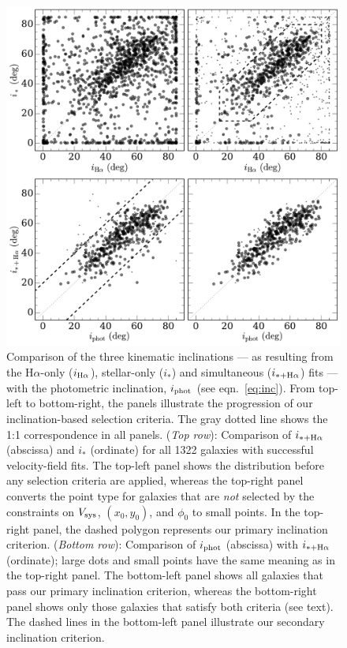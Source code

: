 \documentclass[apj,iop,revtex4,numberedappendix]{emulateapj}
\newcommand{\halpha}{H$\alpha$}
\begin{document}
\begin{figure}
%
\includegraphics[width=0.98\columnwidth]{figs/inc_select.pdf}
%
\caption{
%
Comparison of the three kinematic inclinations --- as resulting from the
\halpha-only ($i_{{\rm H}\alpha}$), stellar-only ($i_\ast$) and
simultaneous ($i_{\ast+{\rm H}\alpha}$) fits --- with the photometric
inclination, $i_{\rm phot}$ (see eqn.~\ref{eq:inc}).  From top-left to
bottom-right, the panels illustrate the progression of our
inclination-based selection criteria.  The gray dotted line shows the
1:1 correspondence in all panels.  ({\em Top row}): Comparison of
$i_{\ast+{\rm H}\alpha}$ (abscissa) and $i_\ast$ (ordinate) for all 1322
galaxies with successful velocity-field fits.  The top-left panel shows
the distribution before any selection criteria are applied, whereas the
top-right panel converts the point type for galaxies that are {\em not}
selected by the constraints on $V_{\rm sys}$, $(x_0,y_0)$, and $\phi_0$
to small points.  In the top-right panel, the dashed polygon represents
our primary inclination criterion.  ({\em Bottom row}): Comparison of
$i_{\rm phot}$ (abscissa) with $i_{\ast+{\rm H}\alpha}$ (ordinate);
large dots and small points have the same meaning as in the top-right
panel.  The bottom-left panel shows all galaxies that pass our primary
inclination criterion, whereas the bottom-right panel shows only those
galaxies that satisfy both criteria (see text).  The dashed lines in the
bottom-left panel illustrate our secondary inclination criterion.
%
}
%
\label{fig:incselect}
%
\end{figure}
\end{document}
